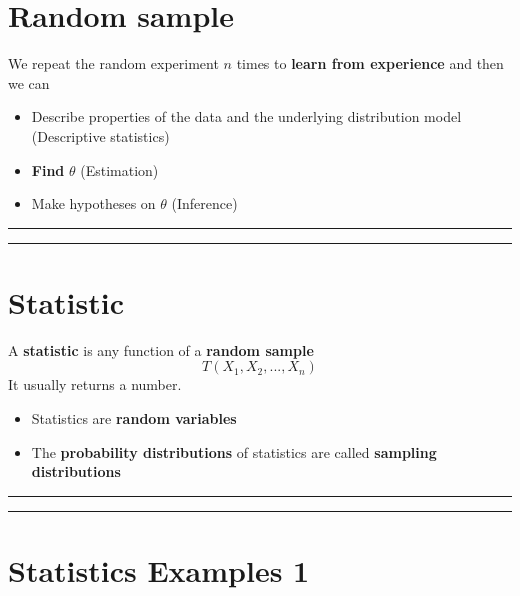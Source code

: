 \documentclass[
]{book}
\begin{document}
\hypertarget{random-sample-2}{%
\section{Random sample}\label{random-sample-2}}

We repeat the random experiment \(n\) times to \textbf{learn from experience} and then we can

\begin{itemize}
\item
  Describe properties of the data and the underlying distribution model (Descriptive statistics)
\item
  \textbf{Find} \(\theta\) (Estimation)
\item
  Make hypotheses on \(\theta\) (Inference)
\end{itemize}

\begin{center}\rule{0.5\linewidth}{0.5pt}\end{center}

\begin{center}\rule{0.5\linewidth}{0.5pt}\end{center}

\hypertarget{statistic}{%
\section{Statistic}\label{statistic}}

A \textbf{statistic} is any function of a \textbf{random sample}
\[T(X_1,X_2, ..., X_n)\]
It usually returns a number.

\begin{itemize}
\item
  Statistics are \textbf{random variables}
\item
  The \textbf{probability distributions} of statistics are called \textbf{sampling distributions}
\end{itemize}

\begin{center}\rule{0.5\linewidth}{0.5pt}\end{center}

\begin{center}\rule{0.5\linewidth}{0.5pt}\end{center}

\hypertarget{statistics-examples-1}{%
\section{Statistics Examples 1}\label{statistics-examples-1}}
\end{document}
